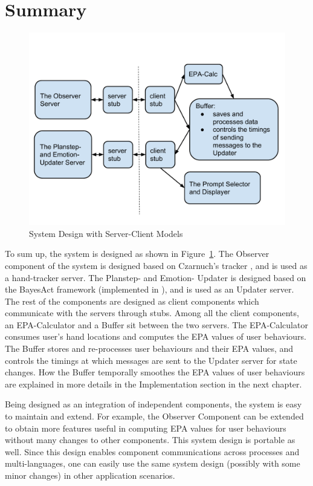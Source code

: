 \section{Summary}

\begin{figure}[htp]
\centering
\includegraphics[trim = 0mm 15mm 0mm 20mm, clip, width=0.9\linewidth]{fig/fig-system.pdf}
\caption{System Design with Server-Client Models}
\label{fig:system}
\end{figure}

To sum up, the system is designed as shown in Figure~\ref{fig:system}. The Observer component of the system is designed based on Czarnuch's tracker \cite{czarnuch2014}, and is used as a hand-tracker server. The Planstep- and Emotion- Updater is designed based on the BayesAct framework (implemented in \cite{hoey2013bayesian}), and is used as an Updater server. The rest of the components are designed as client components which communicate with the servers through stubs. Among all the client components, an EPA-Calculator and a Buffer sit between the two servers. The EPA-Calculator consumes user's hand locations and computes the EPA values of user behaviours. The Buffer stores and re-processes user behaviours and their EPA values, and controls the timings at which messages are sent to the Updater server for state changes. How the Buffer temporally smoothes the EPA values of user behaviours are explained in more details in the Implementation section in the next chapter.

Being designed as an integration of independent components, the system is easy to maintain and extend. For example, the Observer Component can be extended to obtain more features useful in computing EPA values for user behaviours without many changes to other components. This system design is portable as well. Since this design enables component communications across processes and multi-languages, one can easily use the same system design (possibly with some minor changes) in other application scenarios.


